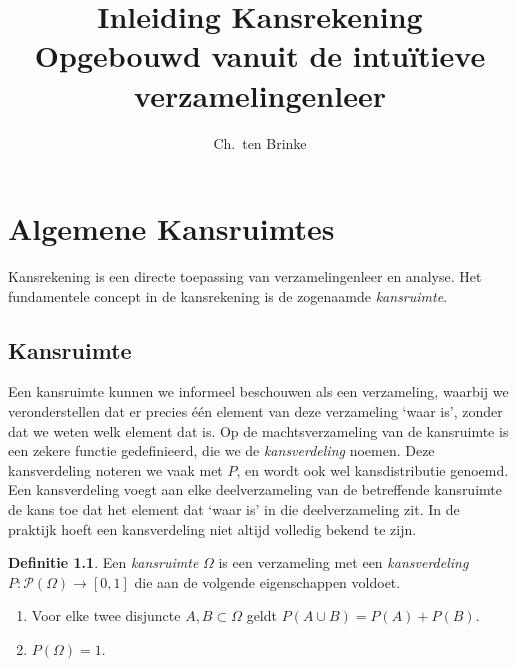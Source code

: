 \documentclass[a4paper]{book}
\title{Inleiding Kansrekening \\ \small{Opgebouwd vanuit de intu\"itieve verzamelingenleer}}
\author{Ch.\ ten Brinke}
\theoremstyle{definition}
\newtheorem{definition}[theorem]{Definitie}
\begin{document}
\maketitle

\chapter{Algemene Kansruimtes}
Kansrekening is een directe toepassing van verzamelingenleer en analyse.
Het fundamentele concept in de kansrekening is de zogenaamde \emph{kansruimte}.



\section{Kansruimte}
Een kansruimte kunnen we informeel beschouwen als een verzameling, waarbij we veronderstellen dat er precies \'e\'en element van deze verzameling `waar is', zonder dat we weten welk element dat is.
Op de machtsverzameling van de kansruimte is een zekere functie gedefinieerd, die we de \emph{kansverdeling} noemen.
Deze kansverdeling noteren we vaak met $P$, en wordt ook wel kansdistributie genoemd.
Een kansverdeling voegt aan elke deelverzameling van de betreffende kansruimte de kans toe dat het element dat `waar is' in die deelverzameling zit.
In de praktijk hoeft een kansverdeling niet altijd volledig bekend te zijn.

\begin{definition}
    Een \emph{kansruimte} $\Omega$ is een verzameling met een \emph{kansverdeling} $P: \mathcal P(\Omega) \to [0,1]$  die aan de volgende eigenschappen voldoet.
    \begin{enumerate}[i]
        \item Voor elke twee disjuncte $A,B \subset \Omega$ geldt $P(A \cup B) = P(A) + P(B)$.
        \item $P(\Omega) = 1$.
    \end{enumerate}
\end{definition}
\end{document}
